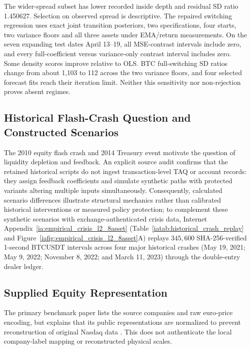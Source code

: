\documentclass[12pt]{article}
\theoremstyle{definition}
\theoremstyle{remark}
\begin{document}
The wider-spread subset has lower recorded inside depth and residual SD ratio 1.450627. Selection on observed spread is descriptive. The repaired switching regression uses exact joint transition posteriors, two specifications, four starts, two variance floors and all three assets under EMA/return measurements. On the seven expanding test dates April 13--19, all MSE-contrast intervals include zero, and every full-coefficient versus variance-only contrast interval includes zero. Some density scores improve relative to OLS. BTC full-switching SD ratios change from about 1,103 to 112 across the two variance floors, and four selected forecast fits reach their iteration limit. Neither this sensitivity nor non-rejection proves absent regimes.

\subsection{Historical Flash-Crash Question and Constructed Scenarios}
\label{sec:historical_flash_crashes}
The 2010 equity flash crash and 2014 Treasury event motivate the question of liquidity depletion and feedback. An explicit source audit confirms that the retained historical scripts do not ingest transaction-level TAQ or account records: they assign feedback coefficients and simulate synthetic paths with protected variants altering multiple inputs simultaneously. Consequently, calculated scenario differences illustrate structural mechanics rather than calibrated historical interventions or measured policy protection; to complement these synthetic scenarios with exchange-authenticated crisis data, Internet Appendix~\ref{ia:empirical_crisis_l2_8asset} (Table~\ref{iatab:historical_crash_replay} and Figure~\ref{iafig:empirical_crisis_l2_8asset}A) replays $345{,}600$ SHA-256-verified 1-second BTCUSDT intervals across four major historical crashes (May 19, 2021; May 9, 2022; November 8, 2022; and March 11, 2023) through the double-entry dealer ledger.\label{fig:equity_flash_crash_taq}

\subsection{Supplied Equity Representation}
The primary benchmark paper lists the source companies and raw euro-price encoding, but explains that its public representations are normalized to prevent reconstruction of original Nasdaq data \citep{ntakaris2018benchmark}. This does not authenticate the local company-label mapping or reconstructed physical scales.
\end{document}
